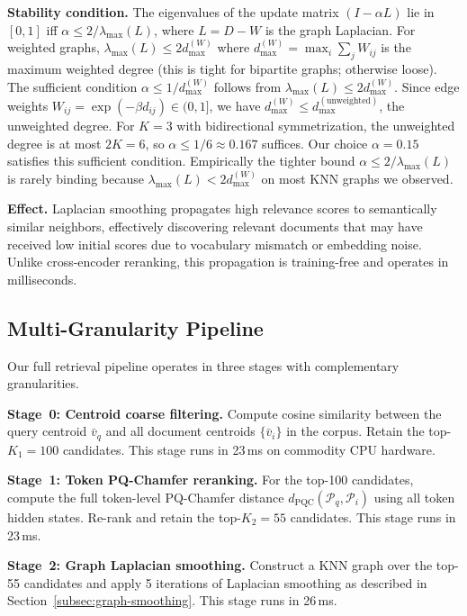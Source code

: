 \documentclass[review,1p]{elsarticle}
\newcommand{\bv}{\bar{v}}
\begin{document}
\textbf{Stability condition.} The eigenvalues of the update matrix $(I - \alpha L)$ lie in $[0,1]$ iff $\alpha \le 2/\lambda_{\max}(L)$, where $L = D - W$ is the graph Laplacian. For weighted graphs, $\lambda_{\max}(L) \le 2 d_{\max}^{(W)}$ where $d_{\max}^{(W)} = \max_i \sum_j W_{ij}$ is the maximum weighted degree (this is tight for bipartite graphs; otherwise loose). The sufficient condition $\alpha \le 1/d_{\max}^{(W)}$ follows from $\lambda_{\max}(L) \le 2 d_{\max}^{(W)}$. Since edge weights $W_{ij} = \exp(-\beta d_{ij}) \in (0, 1]$, we have $d_{\max}^{(W)} \le d_{\max}^{(\text{unweighted})}$, the unweighted degree. For $K = 3$ with bidirectional symmetrization, the unweighted degree is at most $2K = 6$, so $\alpha \le 1/6 \approx 0.167$ suffices. Our choice $\alpha = 0.15$ satisfies this sufficient condition. Empirically the tighter bound $\alpha \le 2/\lambda_{\max}(L)$ is rarely binding because $\lambda_{\max}(L) < 2 d_{\max}^{(W)}$ on most KNN graphs we observed.

\textbf{Effect.} Laplacian smoothing propagates high relevance scores to semantically similar neighbors, effectively discovering relevant documents that may have received low initial scores due to vocabulary mismatch or embedding noise. Unlike cross-encoder reranking, this propagation is training-free and operates in milliseconds.

\subsection{Multi-Granularity Pipeline}
\label{subsec:pipeline}

Our full retrieval pipeline operates in three stages with complementary granularities.

\textbf{Stage~0: Centroid coarse filtering.} Compute cosine similarity between the query centroid $\bv_q$ and all document centroids $\{\bv_i\}$ in the corpus. Retain the top-$K_1 = 100$ candidates. This stage runs in 23\,ms on commodity CPU hardware.

\textbf{Stage~1: Token PQ-Chamfer reranking.} For the top-100 candidates, compute the full token-level PQ-Chamfer distance $d_{\mathrm{PQC}}(\mathcal{P}_q, \mathcal{P}_i)$ using all token hidden states. Re-rank and retain the top-$K_2 = 55$ candidates. This stage runs in 23\,ms.

\textbf{Stage~2: Graph Laplacian smoothing.} Construct a KNN graph over the top-55 candidates and apply 5 iterations of Laplacian smoothing as described in Section~\ref{subsec:graph-smoothing}. This stage runs in 26\,ms.
\end{document}

